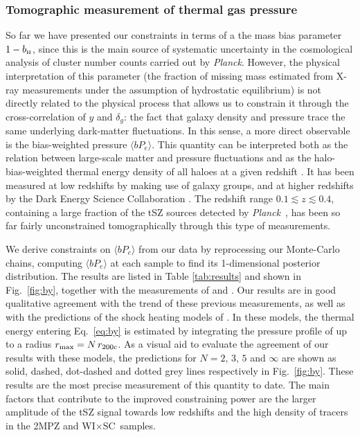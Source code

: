\documentclass[useAMS,usenatbib]{mn2e}
\newcommand{\wisc}{WI$\times$SC}
\def\bH{b_{\scriptscriptstyle\rm H}}
\def\planck{{\it Planck\/}}
\begin{document}
    \subsubsection{Tomographic measurement of thermal gas pressure}\label{ssec:results.fid.bpe}
      So far we have presented our constraints in terms of a the mass bias parameter $1-\bH$, since this is the main source of systematic uncertainty in the cosmological analysis of cluster number counts carried out by \planck. However, the physical interpretation of this parameter (the fraction of missing mass estimated from X-ray measurements under the assumption of hydrostatic equilibrium) is not directly related to the physical process that allows us to constrain it through the cross-correlation of $y$ and $\delta_g$: the fact that galaxy density and pressure trace the same underlying dark-matter fluctuations. In this sense, a more direct observable is the bias-weighted pressure $\langle bP_e\rangle$. This quantity can be interpreted both as the relation between large-scale matter and pressure fluctuations and as the halo-bias-weighted thermal energy density of all haloes at a given redshift \citep{2017JCAP...11..040B}. It has been measured at low  redshifts by \cite{2017MNRAS.467.2315V} making use of galaxy groups, and at higher redshifts by the Dark Energy Science Collaboration \citep{2019arXiv190413347P}. The redshift range $0.1\lesssim z\lesssim0.4$, containing a large fraction of the tSZ sources detected by \planck\ \citep{2016A&A...594A..27P}, has been so far fairly unconstrained tomographically through this type of measurements.

      We derive constraints on $\langle bP_e\rangle$ from our data by reprocessing our Monte-Carlo chains, computing $\langle bP_e\rangle$ at each sample to find its 1-dimensional posterior distribution. The results are listed in Table \ref{tab:results} and shown in Fig.\!~\ref{fig:by}, together with the measurements of \cite{2017MNRAS.467.2315V} and \cite{2019arXiv190413347P}. Our results are in good qualitative agreement with the trend of these previous measurements, as well as with the predictions of the shock heating models of \cite{2012ApJ...758...75B}. In these models, the thermal energy entering Eq.\!~\ref{eq:by} is estimated by integrating the pressure profile of \cite{2012ApJ...758...75B} up to a radius $r_{\rm max}=N\,r_{200c}$. As a visual aid to evaluate the agreement of our results with these models, the predictions for $N=2,\,3,\,5$ and $\infty$ are shown as solid, dashed, dot-dashed and dotted grey lines respectively in Fig.\!~\ref{fig:by}. These results are the most precise measurement of this quantity to date. The main factors that contribute to the improved constraining power are the larger amplitude of the tSZ signal towards low redshifts and the high density of tracers in the 2MPZ and \wisc\ samples.
\end{document}
